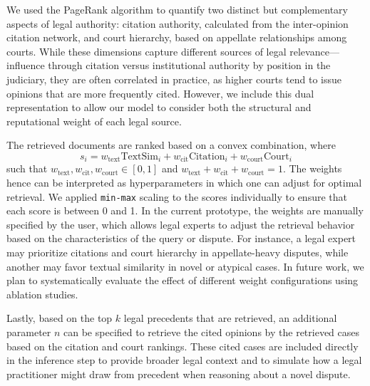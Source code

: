 We used the PageRank algorithm to quantify two distinct but complementary aspects of legal authority: citation authority, calculated from the inter-opinion citation network, and court hierarchy, based on appellate relationships among courts. While these dimensions capture different sources of legal relevance—influence through citation versus institutional authority by position in the judiciary, they are often correlated in practice, as higher courts tend to issue opinions that are more frequently cited. However, we include this dual representation to allow our model to consider both the structural and reputational weight of each legal source.

The retrieved documents are ranked based on a convex combination, where
\begin{equation}
    s_{i} = w_{\text{text}}\text{TextSim}_i + w_{\text{cit}}\text{Citation}_i + w_{\text{court}}\text{Court}_i
\end{equation}
such that $w_{\text{text}}, w_{\text{cit}}, w_{\text{court}} \in [0,1]$ and $w_{\text{text}} + w_{\text{cit}} + w_{\text{court}} = 1$. The weights hence can be interpreted as hyperparameters in which one can adjust for optimal retrieval. We applied \texttt{min-max} scaling to the scores individually to ensure that each score is between 0 and 1. In the current prototype, the weights are manually specified by the user, which allows legal experts to adjust the retrieval behavior based on the characteristics of the query or dispute. For instance, a legal expert may prioritize citations and court hierarchy in appellate-heavy disputes, while another may favor textual similarity in novel or atypical cases. In future work, we plan to systematically evaluate the effect of different weight configurations using ablation studies.

Lastly, based on the top $k$ legal precedents that are retrieved, an additional parameter $n$ can be specified to retrieve the cited opinions by the retrieved cases based on the citation and court rankings. These cited cases are included directly in the inference step to provide broader legal context and to simulate how a legal practitioner might draw from precedent when reasoning about a novel dispute.

